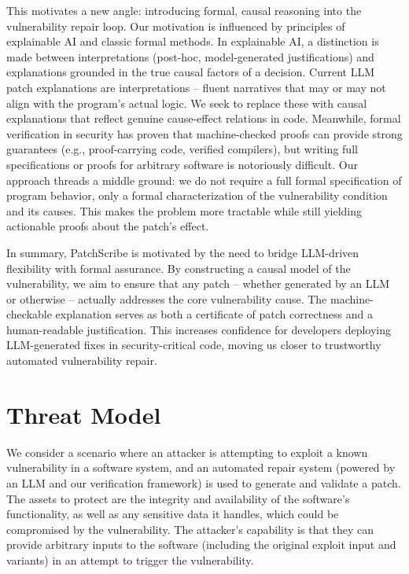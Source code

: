 \documentclass[conference,compsoc]{IEEEtran}
\begin{document}
This motivates a new angle: introducing formal, causal reasoning into
the vulnerability repair loop. Our motivation is influenced by
principles of explainable AI and classic formal methods. In explainable
AI, a distinction is made between interpretations (post-hoc,
model-generated justifications) and explanations grounded in the true
causal factors of a decision. Current LLM patch explanations are
interpretations -- fluent narratives that may or may not align with the
program's actual logic. We seek to replace these with causal
explanations that reflect genuine cause-effect relations in code.
Meanwhile, formal verification in security has proven that
machine-checked proofs can provide strong guarantees (e.g.,
proof-carrying code, verified compilers), but writing full
specifications or proofs for arbitrary software is notoriously
difficult. Our approach threads a middle ground: we do not require a
full formal specification of program behavior, only a formal
characterization of the vulnerability condition and its causes. This
makes the problem more tractable while still yielding actionable proofs
about the patch's effect.

In summary, PatchScribe is motivated by the need to bridge LLM-driven
flexibility with formal assurance. By constructing a causal model of the
vulnerability, we aim to ensure that any patch -- whether generated by
an LLM or otherwise -- actually addresses the core vulnerability cause.
The machine-checkable explanation serves as both a certificate of patch
correctness and a human-readable justification. This increases
confidence for developers deploying LLM-generated fixes in
security-critical code, moving us closer to trustworthy automated
vulnerability repair.

\section{Threat Model}\label{threat-model}

We consider a scenario where an attacker is attempting to exploit a
known vulnerability in a software system, and an automated repair system
(powered by an LLM and our verification framework) is used to generate
and validate a patch. The assets to protect are the integrity and
availability of the software's functionality, as well as any sensitive
data it handles, which could be compromised by the vulnerability. The
attacker's capability is that they can provide arbitrary inputs to the
software (including the original exploit input and variants) in an
attempt to trigger the vulnerability.
\end{document}
